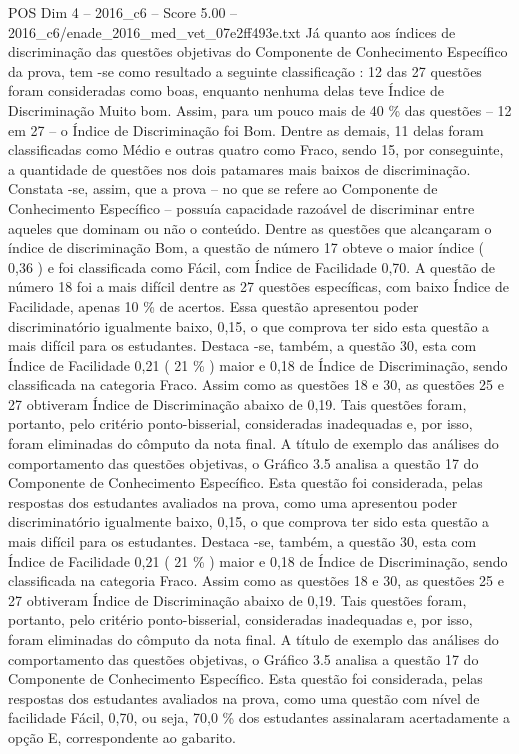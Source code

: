 \begin{textsample}{POS Dim 4 – 2016\_c6 – Score 5.00 – 2016\_c6/enade\_2016\_med\_vet\_07e2ff493e.txt}
Já quanto aos índices de discriminação das questões objetivas do Componente de Conhecimento Específico da prova, tem -se como resultado a seguinte classificação : 12 das 27 questões foram consideradas como boas, enquanto nenhuma delas teve Índice de Discriminação Muito bom.
Assim, para um pouco mais de 40 \% das questões – 12 em 27 – o Índice de Discriminação foi Bom.
Dentre as demais, 11 delas foram classificadas como Médio e outras quatro como Fraco, sendo 15, por conseguinte, a quantidade de questões nos dois patamares mais baixos de discriminação.
Constata -se, assim, que a prova – no que se refere ao Componente de Conhecimento Específico – possuía capacidade razoável de discriminar entre aqueles que dominam ou não o conteúdo.
Dentre as questões que alcançaram o índice de discriminação Bom, a questão de número 17 obteve o maior índice ( 0,36 ) e foi classificada como Fácil, com Índice de Facilidade 0,70.
A questão de número 18 foi a mais difícil dentre as 27 questões específicas, com baixo Índice de Facilidade, apenas 10 \% de acertos.
Essa questão apresentou poder discriminatório igualmente baixo, 0,15, o que comprova ter sido esta questão a mais difícil para os estudantes.
Destaca -se, também, a questão 30, esta com Índice de Facilidade 0,21 ( 21 \% ) maior e 0,18 de Índice de Discriminação, sendo classificada na categoria Fraco.
Assim como as questões 18 e 30, as questões 25 e 27 obtiveram Índice de Discriminação abaixo de 0,19.
Tais questões foram, portanto, pelo critério ponto-bisserial, consideradas inadequadas e, por isso, foram eliminadas do cômputo da nota final.
A título de exemplo das análises do comportamento das questões objetivas, o Gráfico 3.5 analisa a questão 17 do Componente de Conhecimento Específico.
Esta questão foi considerada, pelas respostas dos estudantes avaliados na prova, como uma apresentou poder discriminatório igualmente baixo, 0,15, o que comprova ter sido esta questão a mais difícil para os estudantes.
Destaca -se, também, a questão 30, esta com Índice de Facilidade 0,21 ( 21 \% ) maior e 0,18 de Índice de Discriminação, sendo classificada na categoria Fraco.
Assim como as questões 18 e 30, as questões 25 e 27 obtiveram Índice de Discriminação abaixo de 0,19.
Tais questões foram, portanto, pelo critério ponto-bisserial, consideradas inadequadas e, por isso, foram eliminadas do cômputo da nota final.
A título de exemplo das análises do comportamento das questões objetivas, o Gráfico 3.5 analisa a questão 17 do Componente de Conhecimento Específico.
Esta questão foi considerada, pelas respostas dos estudantes avaliados na prova, como uma questão com nível de facilidade Fácil, 0,70, ou seja, 70,0 \% dos estudantes assinalaram acertadamente a opção E, correspondente ao gabarito.

\end{textsample}
